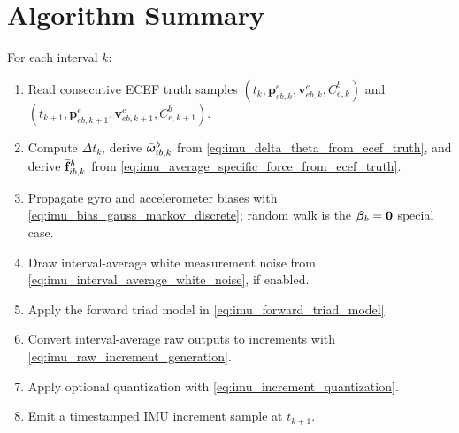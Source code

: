 \section{Algorithm Summary}

For each interval $k$:
\begin{enumerate}
    \item Read consecutive ECEF truth samples
    $(t_k,\mathbf{p}_{eb,k}^{e},\mathbf{v}_{eb,k}^{e},C_{e,k}^{b})$ and
    $(t_{k+1},\mathbf{p}_{eb,k+1}^{e},\mathbf{v}_{eb,k+1}^{e},C_{e,k+1}^{b})$.
    \item Compute $\Delta t_k$, derive
    $\bar{\boldsymbol{\omega}}_{ib,k}^{b}$ from
    \cref{eq:imu_delta_theta_from_ecef_truth}, and derive
    $\bar{\mathbf{f}}_{ib,k}^{b}$ from
    \cref{eq:imu_average_specific_force_from_ecef_truth}.
    \item Propagate gyro and accelerometer biases with
    \cref{eq:imu_bias_gauss_markov_discrete}; random walk is the
    $\boldsymbol\beta_b=\mathbf{0}$ special case.
    \item Draw interval-average white measurement noise from
    \cref{eq:imu_interval_average_white_noise}, if enabled.
    \item Apply the forward triad model in \cref{eq:imu_forward_triad_model}.
    \item Convert interval-average raw outputs to increments with
    \cref{eq:imu_raw_increment_generation}.
    \item Apply optional quantization with
    \cref{eq:imu_increment_quantization}.
    \item Emit a timestamped IMU increment sample at $t_{k+1}$.
\end{enumerate}
